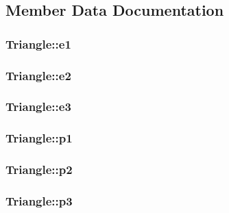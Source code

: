 \subsection{Member Data Documentation}
\subsubsection[{\texorpdfstring{e1}{e1}}]{ Triangle::e1}\hypertarget{class_triangle_ab91aa48d8a4c25deecd1a35433a38260}{}\label{class_triangle_ab91aa48d8a4c25deecd1a35433a38260}
\subsubsection[{\texorpdfstring{e2}{e2}}]{ Triangle::e2}\hypertarget{class_triangle_a5ad4339f6fb03adb4f6ee840ace34d82}{}\label{class_triangle_a5ad4339f6fb03adb4f6ee840ace34d82}
\subsubsection[{\texorpdfstring{e3}{e3}}]{ Triangle::e3}\hypertarget{class_triangle_aa55fc8f8662cba36b227858760bb173c}{}\label{class_triangle_aa55fc8f8662cba36b227858760bb173c}
\subsubsection[{\texorpdfstring{p1}{p1}}]{ Triangle::p1}\hypertarget{class_triangle_af2ff757f1bff3177e1a0e8c19664edbc}{}\label{class_triangle_af2ff757f1bff3177e1a0e8c19664edbc}
\subsubsection[{\texorpdfstring{p2}{p2}}]{ Triangle::p2}\hypertarget{class_triangle_a6a7d000238fb26c47181de1e7a502037}{}\label{class_triangle_a6a7d000238fb26c47181de1e7a502037}
\subsubsection[{\texorpdfstring{p3}{p3}}]{ Triangle::p3}\hypertarget{class_triangle_a43b6750934c84aff2f34b38d2f26d012}{}\label{class_triangle_a43b6750934c84aff2f34b38d2f26d012}
